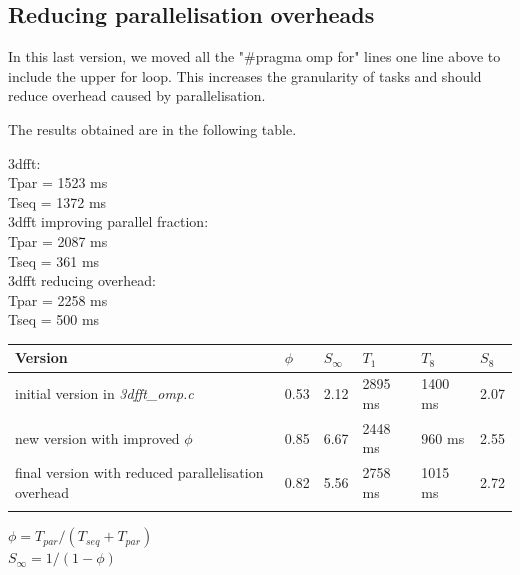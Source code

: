 \documentclass[12]{article}
\begin{document}
\subsection{Reducing parallelisation overheads}
In this last version, we moved all the "\#pragma omp for" lines one line above to include the upper for loop. This increases the granularity of tasks and should reduce overhead caused by parallelisation. 




\bigskip

The results obtained are in the following table.

3dfft: \\
Tpar = 1523 ms \\
Tseq = 1372 ms \\

3dfft improving parallel fraction: \\
Tpar = 2087 ms \\
Tseq = 361 ms \\

3dfft reducing overhead: \\
Tpar = 2258 ms \\
Tseq = 500 ms \\

\bigskip

\begin{table}[H]
\begin{tabular}{|l|l|l|l|l|l|}
\hline \textbf{Version} & $\phi $ & $S_\infty$ & $T_1$ & $T_8$ & $S_8$ \\ \hline
initial version in \textit{3dfft\_omp.c} & 0.53 & 2.12 & 2895 ms & 1400 ms & 2.07 \\ \hline
new version with improved $\phi$ & 0.85 & 6.67 & 2448 ms & 960 ms & 2.55 \\ \hline
final version with reduced parallelisation overhead & 0.82 & 5.56 & 2758 ms & 1015 ms & 2.72 \\ \hline

\bigskip

\end{tabular}
\begin{center}
$\phi = T_{par} / (T_{seq} + T_{par}) $ \\
$S_\infty = 1 / (1 - \phi) $
\end{center}
\end{table}

\end{document}

